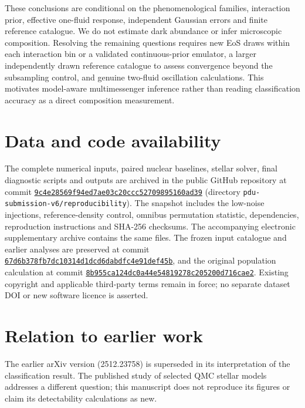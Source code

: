 \documentclass[11pt,a4paper]{article}
\begin{document}
These conclusions are conditional on the phenomenological families, interaction prior, effective one-fluid response, independent Gaussian errors and finite reference catalogue. We do not estimate dark abundance or infer microscopic composition. Resolving the remaining questions requires new EoS draws within each interaction bin or a validated continuous-prior emulator, a larger independently drawn reference catalogue to assess convergence beyond the subsampling control, and genuine two-fluid oscillation calculations. This motivates model-aware multimessenger inference rather than reading classification accuracy as a direct composition measurement.
\section*{Data and code availability}
The complete numerical inputs, paired nuclear baselines, stellar solver, final diagnostic scripts and outputs are archived in the public GitHub repository at commit \href{https://github.com/wasif553/ML-NeutronStar-Classification/tree/9c4e28569f94ed7ae03c20ccc52709895160ad39/pdu-submission-v6/reproducibility}{\nolinkurl{9c4e28569f94ed7ae03c20ccc52709895160ad39}} (directory \texttt{pdu-submission-v6/reproducibility}). The snapshot includes the low-noise injections, reference-density control, omnibus permutation statistic, dependencies, reproduction instructions and SHA-256 checksums. The accompanying electronic supplementary archive contains the same files. The frozen input catalogue and earlier analyses are preserved at commit \href{https://github.com/wasif553/ML-NeutronStar-Classification/tree/67d6b378fb7dc10314d1dcd6dabdfc4e91def45b}{\nolinkurl{67d6b378fb7dc10314d1dcd6dabdfc4e91def45b}}, and the original population calculation at commit \href{https://github.com/wasif553/ML-NeutronStar-Classification/tree/8b955ca124dc0a44e54819278c205200d716cae2}{\nolinkurl{8b955ca124dc0a44e54819278c205200d716cae2}}. Existing copyright and applicable third-party terms remain in force; no separate dataset DOI or new software licence is asserted.
\section*{Relation to earlier work}
The earlier arXiv version (2512.23758) is superseded in its interpretation of the classification result. The published study of selected QMC stellar models \citep{HusainOsc} addresses a different question; this manuscript does not reproduce its figures or claim its detectability calculations as new.
\appendix
\end{document}
